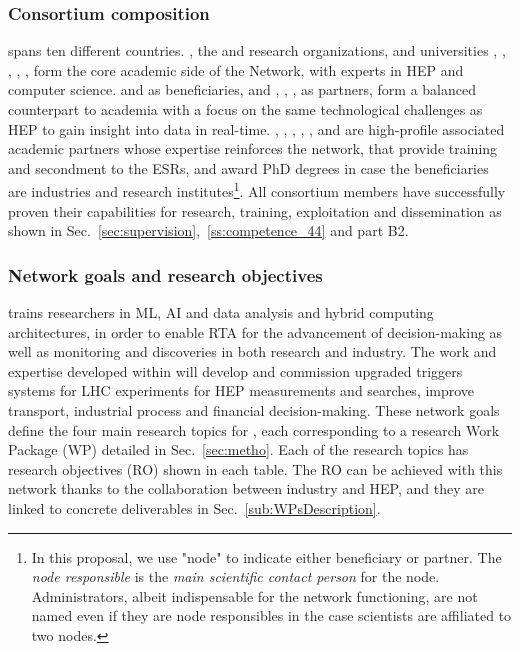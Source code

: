 \subsubsection*{Consortium composition}

\acronym spans ten different countries. 
\cernentity, the \nikhefentity and \cnrsentity research organizations, and universities \sorbonneentity, \helsinkientity, \unigeentity, \dortmundentity, \lundentity, \heidelbergentity form the core academic side of the Network, with experts in HEP and computer science.
\ibmentity and \fleetmaticsentity as beneficiaries, and \ximantisentity, \lightboxentity, \pointeightentity, as partners, form a balanced counterpart to academia with a focus on the same technological challenges as HEP to gain insight into data in real-time. 
\oregonentity, \ohioentity, \pisaentity, \santiagoentity, \liegesentity, \radboudentity and \amsterdamentity are high-profile associated academic partners whose expertise reinforces the network, that provide training and secondment to the ESRs, and award PhD degrees in case the beneficiaries are industries and research institutes\footnote{In this proposal, we use "node" to indicate
either beneficiary or partner. The \textit{node responsible} is the \textit{main scientific contact person} for the node. Administrators, albeit indispensable for the network functioning, are not named even if they are node responsibles in the case scientists are affiliated to two nodes.}.
All consortium members have successfully proven their capabilities for research, training, exploitation and dissemination as shown in Sec.~\ref{sec:supervision},~\ref{ss:competence_44} and part B2.

\subsubsection*{Network goals and research objectives}

\acronym trains researchers in ML, AI and data analysis and hybrid computing architectures, in order to enable RTA for the advancement of decision-making as well as monitoring and discoveries in both research and industry. 
The work and expertise developed within \acronym will develop and commission upgraded triggers systems for LHC experiments for HEP measurements and searches, improve transport, industrial process and financial decision-making. 
These network goals define the four main research topics for \acronym, each corresponding to a research Work Package (WP) detailed in Sec.~\ref{sec:metho}. 
Each of the research topics has research objectives (RO) shown in each table. The RO can be achieved with this network thanks to the collaboration between industry and HEP, and they are linked to concrete deliverables in Sec.~\ref{sub:WPsDescription}. 

